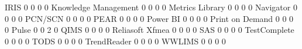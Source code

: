 \documentclass{article}
\begin{document}
\begin{Schunk}
\begin{Soutput}
  IRIS                             0            0   0                      0
  Knowledge Management             0            0   0                      0
  Metrics Library                  0            0   0                      0
  Navigator                        0            0   0                      0
  PCN/SCN                          0            0   0                      0
  PEAR                             0            0   0                      0
  Power BI                         0            0   0                      0
  Print on Demand                  0            0   0                      0
  Pulse                            0            0   2                      0
  QIMS                             0            0   0                      0
  Reliasoft Xfmea                  0            0   0                      0
  SAS                              0            0   0                      0
  TestComplete                     0            0   0                      0
  TODS                             0            0   0                      0
  TrendReader                      0            0   0                      0
  WWLIMS                           0            0   0                      0
                                 

\end{Soutput}
\end{Schunk}
\end{document}
